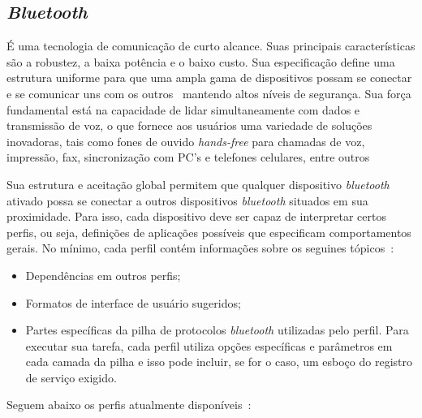 \subsection{\emph{Bluetooth}}

É uma tecnologia de comunicação de curto alcance. Suas principais características são a robustez, a baixa potência e o baixo custo. Sua especificação define uma estrutura uniforme para que uma ampla gama de dispositivos possam se conectar e se comunicar uns com os outros~\cite{bluetoothoverview} mantendo altos níveis de segurança. Sua força fundamental está na capacidade de lidar simultaneamente com dados e transmissão de voz, o que fornece aos usuários uma variedade de soluções inovadoras, tais como fones de ouvido \emph{hands-free} para chamadas de voz, impressão, fax, sincronização com PC's e telefones celulares, entre outros~\cite{bluetoothoverview}

Sua estrutura e aceitação global permitem que qualquer dispositivo \emph{bluetooth} ativado possa se conectar a outros dispositivos \emph{bluetooth} situados em sua proximidade. Para isso, cada dispositivo deve ser capaz de interpretar certos perfis, ou seja, definições de aplicações possíveis que especificam comportamentos gerais. No mínimo, cada perfil contém informações sobre os seguines tópicos~\cite{bluetoothprofiles}:

\begin{itemize}
	\item Dependências em outros perfis;
	\item Formatos de interface de usuário sugeridos;
	\item Partes específicas da pilha de protocolos \emph{bluetooth} utilizadas pelo perfil. Para executar sua tarefa, cada perfil utiliza opções específicas e parâmetros em cada camada da pilha e isso pode incluir, se for o caso, um esboço do registro de serviço exigido.
\end{itemize}

Seguem abaixo os perfis atualmente disponíveis~\cite{bluetoothprofiles}:

